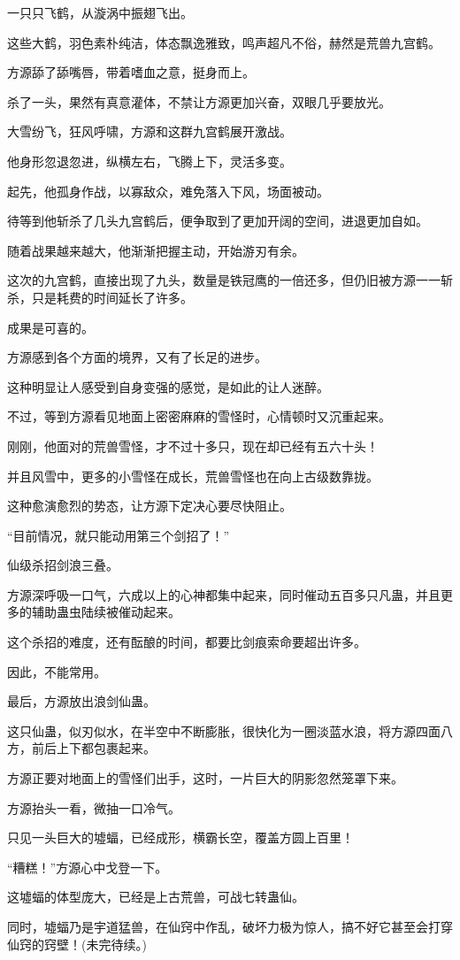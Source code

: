 \begin{this_body}
一只只飞鹤，从漩涡中振翅飞出。

这些大鹤，羽色素朴纯洁，体态飘逸雅致，鸣声超凡不俗，赫然是荒兽九宫鹤。

方源舔了舔嘴唇，带着嗜血之意，挺身而上。

杀了一头，果然有真意灌体，不禁让方源更加兴奋，双眼几乎要放光。

大雪纷飞，狂风呼啸，方源和这群九宫鹤展开激战。

他身形忽退忽进，纵横左右，飞腾上下，灵活多变。

起先，他孤身作战，以寡敌众，难免落入下风，场面被动。

待等到他斩杀了几头九宫鹤后，便争取到了更加开阔的空间，进退更加自如。

随着战果越来越大，他渐渐把握主动，开始游刃有余。

这次的九宫鹤，直接出现了九头，数量是铁冠鹰的一倍还多，但仍旧被方源一一斩杀，只是耗费的时间延长了许多。

成果是可喜的。

方源感到各个方面的境界，又有了长足的进步。

这种明显让人感受到自身变强的感觉，是如此的让人迷醉。

不过，等到方源看见地面上密密麻麻的雪怪时，心情顿时又沉重起来。

刚刚，他面对的荒兽雪怪，才不过十多只，现在却已经有五六十头！

并且风雪中，更多的小雪怪在成长，荒兽雪怪也在向上古级数靠拢。

这种愈演愈烈的势态，让方源下定决心要尽快阻止。

“目前情况，就只能动用第三个剑招了！”

仙级杀招剑浪三叠。

方源深呼吸一口气，六成以上的心神都集中起来，同时催动五百多只凡蛊，并且更多的辅助蛊虫陆续被催动起来。

这个杀招的难度，还有酝酿的时间，都要比剑痕索命要超出许多。

因此，不能常用。

最后，方源放出浪剑仙蛊。

这只仙蛊，似刃似水，在半空中不断膨胀，很快化为一圈淡蓝水浪，将方源四面八方，前后上下都包裹起来。

方源正要对地面上的雪怪们出手，这时，一片巨大的阴影忽然笼罩下来。

方源抬头一看，微抽一口冷气。

只见一头巨大的墟蝠，已经成形，横霸长空，覆盖方圆上百里！

“糟糕！”方源心中戈登一下。

这墟蝠的体型庞大，已经是上古荒兽，可战七转蛊仙。

同时，墟蝠乃是宇道猛兽，在仙窍中作乱，破坏力极为惊人，搞不好它甚至会打穿仙窍的窍壁！(未完待续。)

\end{this_body}

